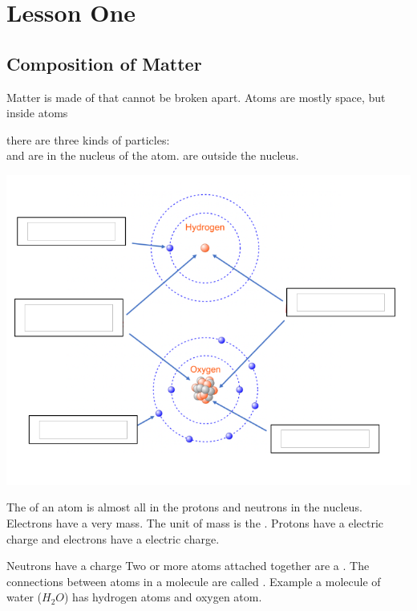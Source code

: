 \documentclass[answers,12pt]{exam}
\begin{document}
\section{Lesson One}

\subsection{Composition of Matter}

\begin{questions}
  

  \question Matter is made of \fillin[atoms] that cannot be broken apart.
  \question Atoms are mostly \fillin[empty] space, but inside atoms 
  
  there are three kinds of particles:\\
       \fillin[protons] and \fillin[neutrons] are in the nucleus of the atom.
       \fillin[electrons] are outside the nucleus.

  


\end{questions}

\begin{center}
  \includegraphics[width=1\textwidth]{atomLabel.png}
  
\end{center}

\begin{questions}
  

  \question The \fillin[mass] of an atom is almost all in the protons and neutrons in the nucleus.
  \question Electrons have a very \fillin[small] mass.
  \question The unit of mass is the \fillin[kilogram].
  \question Protons have a \fillin[positive(+)] electric charge and electrons have a \fillin[negative(-)] electric charge.

  \question Neutrons have a \fillin[neutral] charge
  \question Two or more atoms attached together are a \fillin[molecule].
  \question The connections between atoms in a molecule are called .
  \question Example a molecule of water ($H_2O$) has \fillin[two] hydrogen atoms and \fillin[one] oxygen atom.
  
\end{questions}
\end{document}
